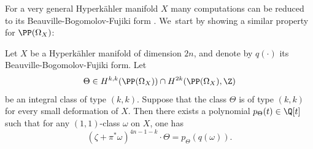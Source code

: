 For a very general Hyperkähler manifold $X$ many computations can be reduced to its Beauville-Bogomolov-Fujiki form \cite{Huy99}. We~start by showing a similar property for $\PP(\Omega_X)$:

\begin{lemma}\label{lemmakeycomputation}
Let $X$ be a Hyperkähler manifold of dimension $2n$, and denote by $q(\cdot)$ its Beauville-Bogomolov-Fujiki form.
Let
\[
\Theta \in
H^{k,k}(\PP(\Omega_X))\cap H^{2k}(\PP(\Omega_X),\Z)
\]
be an integral class of type $(k,k)$. Suppose that the class $\Theta$ is of type $(k,k)$ for every small deformation
of $X$.
Then there exists a polynomial
$p_\Theta(t) \in \Q[t]$ such that for any $(1,1)$-class $\omega$ on $X$, one has
\[
(\zeta + \pi^* \omega)^{4n-1-k} \cdot \Theta = p_\Theta(q(\omega)).
\]
\end{lemma}

